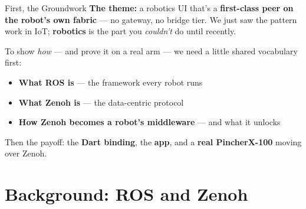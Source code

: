 \documentclass[9pt]{beamer}
\begin{document}
\begin{frame}{First, the Groundwork}
  \textbf{The theme:} a robotics UI that's a \textbf{first-class peer on the robot's own fabric} --- no gateway, no bridge tier. We just saw the pattern work in IoT; \textbf{robotics} is the part you \emph{couldn't} do until recently.

  \vspace{0.5em}
  To show \emph{how} --- and prove it on a real arm --- we need a little shared vocabulary first:
  \begin{itemize}
    \item \textbf{What ROS is} --- the framework every robot runs
    \item \textbf{What Zenoh is} --- the data-centric protocol
    \item \textbf{How Zenoh becomes a robot's middleware} --- and what it unlocks
  \end{itemize}

  \vspace{0.4em}
  Then the payoff: the \textbf{Dart binding}, the \textbf{app}, and a \textbf{real PincherX-100} moving over Zenoh.
\end{frame}

\section{Background: ROS and Zenoh}
\end{document}
